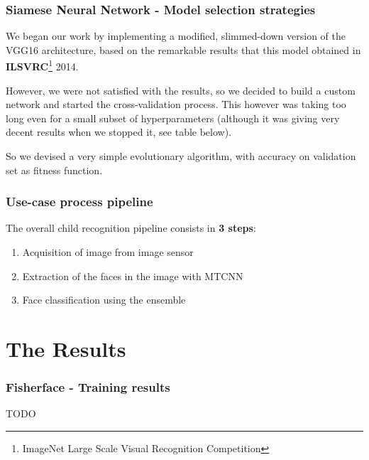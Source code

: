 \documentclass{beamer}
\begin{document}
	\begin{frame}
		\frametitle{Siamese Neural Network - Model selection strategies}
		We began our work by implementing a modified, slimmed-down version of the VGG16 architecture, based on the remarkable results that this model obtained in \textbf{ILSVRC}\footnote{ImageNet Large Scale Visual Recognition Competition} 2014.
	
		\bigskip
		
		However, we were not satisfied with the results, so we decided to build a custom network and started the cross-validation process. This however was taking too long even for a small subset of hyperparameters (although it was giving very decent results when we stopped it, see table below).
		
		\bigskip
		
		So we devised a very simple evolutionary algorithm, with accuracy on validation set as fitness function.
	\end{frame}
		
	
	\begin{frame}
		\frametitle{Use-case process pipeline}
		The overall child recognition pipeline consists in \textbf{3 steps}:
		\begin{enumerate}
			\item Acquisition of image from image sensor
			\item Extraction of the faces in the image with MTCNN
			\item Face classification using the ensemble
		\end{enumerate}
	\end{frame}	
	
	\section{The Results}

	\begin{frame}
		\frametitle{Fisherface - Training results}
		TODO	
	\end{frame}
	
\end{document}
